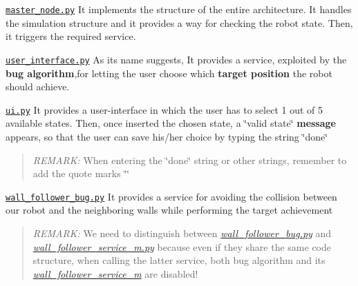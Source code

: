 \begin{DoxyEnumerate}
\item \href{https://github.com/fedehub/final_assignment/tree/main/scripts/master_node.py}{\tt master\+\_\+node.\+py} It implements the structure of the entire architecture. It handles the simulation structure and it provides a way for checking the robot state. Then, it triggers the required service.
\item \href{https://github.com/fedehub/final_assignment/tree/main/scripts/user_interface.py}{\tt user\+\_\+interface.\+py} As its name suggests, It provides a service, exploited by the {\bfseries bug algorithm},for letting the user choose which {\bfseries target position} the robot should achieve.
\item \href{https://github.com/fedehub/final_assignment/tree/main/scripts/ui.py}{\tt ui.\+py} It provides a user-\/interface in which the user has to select 1 out of 5 available states. Then, once inserted the chosen state, a \char`\"{}valid state\char`\"{} {\bfseries message} appears, so that the user can save his/her choice by typing the string \char`\"{}done\char`\"{} \begin{quote}
{\itshape R\+E\+M\+A\+RK\+:} When entering the \char`\"{}done\char`\"{} string or other strings, remember to add the quote marks \char`\"{}\char`\"{} \end{quote}

\item \href{https://github.com/fedehub/final_assignment/tree/main/scripts/wall_follower_bug.py}{\tt wall\+\_\+follower\+\_\+bug.\+py} It provides a service for avoiding the collision between our robot and the neighboring walls while performing the target achievement \begin{quote}
{\itshape R\+E\+M\+A\+RK\+:} We need to distinguish between {\itshape \hyperlink{wall__follower__bug_8py}{wall\+\_\+follower\+\_\+bug.\+py}} and {\itshape \hyperlink{wall__follower__service__m_8py}{wall\+\_\+follower\+\_\+service\+\_\+m.\+py}} because even if they share the same code structure, when calling the latter service, both \textquotesingle{}bug algorithm\textquotesingle{} and its {\itshape \hyperlink{namespacewall__follower__service__m}{wall\+\_\+follower\+\_\+service\+\_\+m}} are disabled! \end{quote}


\end{DoxyEnumerate}
